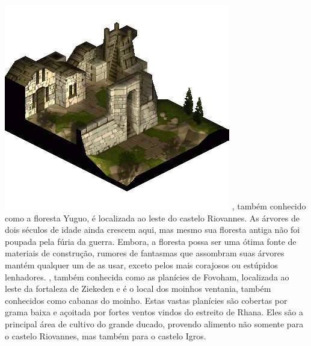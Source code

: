 %
\vfill
{}
%
\clearpage
\includegraphics[width=\columnwidth]{./art/worldbook/yardrow.jpg}
\vfill
%
, também conhecido como a floresta Yuguo, é localizada ao leste do castelo Riovannes. 
As árvores de dois séculos de idade ainda crescem aqui, mas mesmo sua floresta antiga não foi poupada pela fúria da guerra.
Embora, a floresta possa ser uma ótima fonte de materiais de construção, rumores de fantasmas que assombram suas árvores mantém qualquer um de as usar, exceto pelos mais corajosos ou estúpidos lenhadores.
, também conhecida como as planícies de Fovoham, localizada ao leste da fortaleza de Ziekeden e é o local dos moinhos ventania, também conhecidos como cabanas do moinho.
Estas vastas planícies são cobertas por grama baixa e açoitada por fortes ventos vindos do estreito de Rhana.
Eles são a principal área de cultivo do grande ducado, provendo alimento não somente para o castelo Riovannes, mas também para o castelo Igros.
%
\vfill
